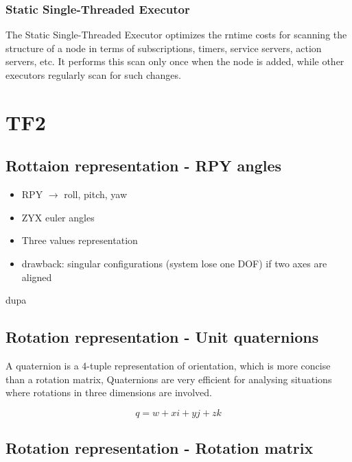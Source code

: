 \subsubsection{Static Single-Threaded Executor}

The Static Single-Threaded Executor optimizes the rntime costs for scanning the structure of  a node in terms of subscriptions, timers, service servers, action servers, etc.
It performs this scan only once when the node is added, while other executors regularly scan for such changes.




\section{TF2}

\subsection{Rottaion representation - RPY angles}

\begin{itemize}
        \item RPY $\rightarrow$ roll, pitch, yaw
        \item ZYX euler angles
        \item Three values representation
        \item drawback: singular configurations (system lose one DOF) if two axes are aligned
        
\end{itemize}


dupa



\subsection{Rotation representation - Unit quaternions}

A quaternion is a 4-tuple representation of orientation, which is more concise than a rotation matrix, Quaternions are very efficient for analysing situations where rotations in three dimensions are involved.

 \begin{equation}
    q = w + xi + yj + zk
\end{equation}

\subsection{Rotation representation - Rotation matrix}

